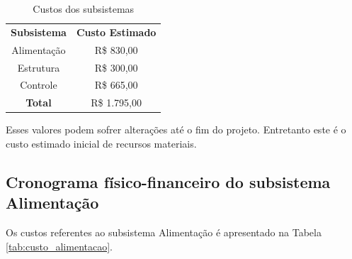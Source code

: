 \begin{table}[h]
 \centering
 \caption{Custos dos subsistemas} \label{tab:custo_sub}
 {\renewcommand\arraystretch{1.25}
 \begin{tabular}{ l l }
  \cline{1-1}\cline{2-2}  
    \multicolumn{1}{|c|}{\textbf{Subsistema}} &
    \multicolumn{1}{c|}{\textbf{Custo Estimado}}
  \\  
  \cline{1-1}\cline{2-2}  
    \multicolumn{1}{|c|}{Alimentação} &
    \multicolumn{1}{c|}{R\$ 830,00}
  \\  
  \cline{1-1}\cline{2-2}  
    \multicolumn{1}{|c|}{Estrutura} &
    \multicolumn{1}{c|}{R\$ 300,00}
  \\  
  \cline{1-1}\cline{2-2}  
    \multicolumn{1}{|c|}{Controle} &
    \multicolumn{1}{c|}{R\$ 665,00}
  \\  
  \cline{1-1}\cline{2-2}  
    \multicolumn{1}{|c|}{\textbf{Total}} &
    \multicolumn{1}{c|}{R\$ 1.795,00}
  \\  
  \hline

 \end{tabular} }
\end{table}

Esses valores podem sofrer alterações até o fim do projeto. Entretanto este é o custo estimado inicial de recursos materiais.

\subsection{Cronograma físico-financeiro do subsistema Alimentação}

Os custos referentes ao subsistema Alimentação é apresentado na Tabela \ref{tab:custo_alimentacao}. 


